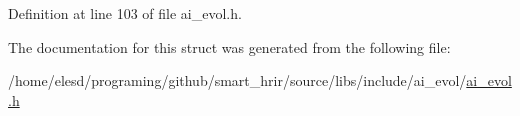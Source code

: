 Definition at line 103 of file ai\-\_\-evol.\-h.



The documentation for this struct was generated from the following file\-:\begin{DoxyCompactItemize}
\item 
/home/elesd/programing/github/smart\-\_\-hrir/source/libs/include/ai\-\_\-evol/\hyperlink{a00008}{ai\-\_\-evol.\-h}\end{DoxyCompactItemize}
